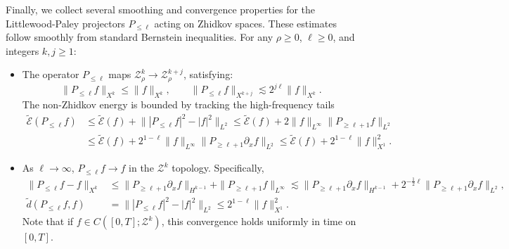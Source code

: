\documentclass{amsart}
\numberwithin{equation}{section}
\begin{document}
Finally, we collect several smoothing and convergence properties for the Littlewood-Paley projectors $P_{\leq \ell}$ acting on Zhidkov spaces. These estimates follow smoothly from standard Bernstein inequalities. For any $\rho\geq 0$, $\ell\geq 0$, and integers $k, j\geq 1$:

\begin{itemize}
    \item The operator $P_{\leq \ell}$ maps $\mathcal{Z}^k_\rho \to \mathcal{Z}^{k+j}_\rho$, satisfying:
    \begin{equation}\label{est:EkPl}
    \| P_{\leq\ell}f\|_{X^k}\leq \| f\|_{X^k},\qquad \| P_{\leq \ell}f\|_{X^{k+j}}\lesssim 2^{j\ell}\| f\|_{X^k}.
    \end{equation}
    The non-Zhidkov energy is bounded by tracking the high-frequency tails
    \[\begin{aligned}
\widetilde{\mathcal{E}}(P_{\leq \ell}f)&\leq \widetilde{\mathcal{E}}(f) +\big\| |P_{\leq \ell}f|^2-|f|^2\big\|_{L^2} \leq \widetilde{\mathcal{E}}(f)+2\| f\|_{L^\infty}\| P_{\geq \ell+1}f\|_{L^2} \\
&\leq \widetilde{\mathcal{E}}(f)+2^{1-\ell}\| f\|_{L^\infty}\| P_{\geq \ell+1}\partial_xf\|_{L^2}\leq \widetilde{\mathcal{E}}(f)+2^{1-\ell}\| f\|_{X^1}^2.
\end{aligned}\]

    \item  As $\ell \to \infty$, $P_{\leq \ell}f \to f$ in the $\mathcal{Z}^k$ topology. Specifically,
    \begin{equation}\label{est:dconv}
\begin{aligned}
\| P_{\leq \ell}f-f\|_{X^k}
&\leq \| P_{\geq \ell+1}\partial_xf\|_{H^{k-1}}+\| P_{\geq \ell+1}f\|_{L^\infty} \lesssim \| P_{\geq \ell+1}\partial_xf\|_{H^{k-1}} +2^{-\frac12\ell}\| P_{\geq \ell+1}\partial_xf\|_{L^2}, \\
\widetilde{d}(P_{\leq \ell}f,f)
&=\big\| |P_{\leq \ell}f|^2-|f|^2\big\|_{L^2} \leq 2^{1-\ell}\| f\|_{X^1}^2. 
\end{aligned}
\end{equation}
    Note that if $f\in C([0,T];\mathcal{Z}^k)$, this convergence holds uniformly in time on $[0,T]$.


\end{itemize}
\end{document}
